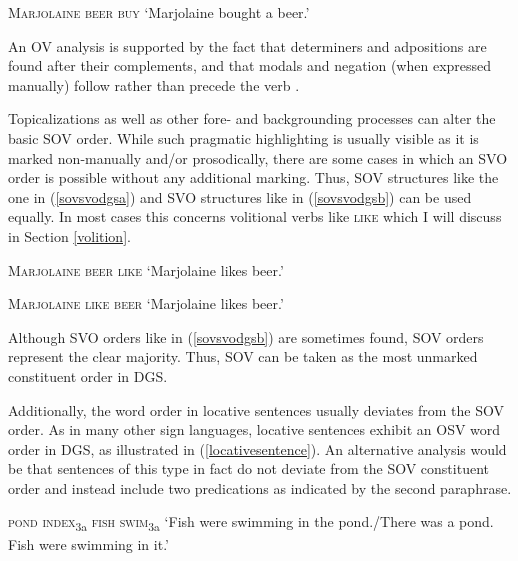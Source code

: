 \begin{exe}
\ex \textsc{Marjolaine beer buy}
\glt `Marjolaine bought a beer.'\label{dgsunmarkedwordorder}
\end{exe}

\noindent An OV analysis is supported by the fact that determiners and adpositions are found after their complements, and that modals and negation (when expressed manually) follow rather than precede the verb \citep{pfauquer2007syntaxofnegationandmodals,bross2017scope}.


Topicalizations as well as other fore- and backgrounding processes can alter the basic SOV order. While such pragmatic highlighting is usually visible as it is marked non-manually and/or prosodically, there are some cases in which an SVO order is possible without any additional marking. Thus, SOV structures like the one in (\ref{sovsvodgsa}) and SVO structures like in (\ref{sovsvodgsb}) can be used equally. In most cases this concerns volitional verbs like \textsc{like} which I will discuss in Section \ref{volition}.

\begin{exe}
\ex\label{sovsvodgsa}
\textsc{Marjolaine beer like}
\glt `Marjolaine likes beer.'\label{sovsvodgsaaba}
\end{exe}

\begin{exe}
\ex\label{sovsvodgsb}
\textsc{Marjolaine like beer}
\glt `Marjolaine likes beer.'
\end{exe}


\noindent Although SVO orders like in (\ref{sovsvodgsb}) are sometimes found, SOV orders represent the clear majority. Thus, SOV can be taken as the most unmarked constituent order in DGS.%

Additionally, the word order in locative sentences usually deviates from the SOV order. As in many other sign languages, locative sentences exhibit an OSV word order in DGS, as illustrated in (\ref{locativesentence}). An alternative analysis would be that sentences of this type in fact do not deviate from the SOV constituent order and instead include two predications as indicated by the second paraphrase.

\begin{exe}
\ex \textsc{pond index}\textsubscript{3a} \textsc{fish swim}\textsubscript{3a}
\glt `Fish were swimming in the pond./There was a pond. Fish were swimming in it.' \label{locativesentence}
\end{exe}

